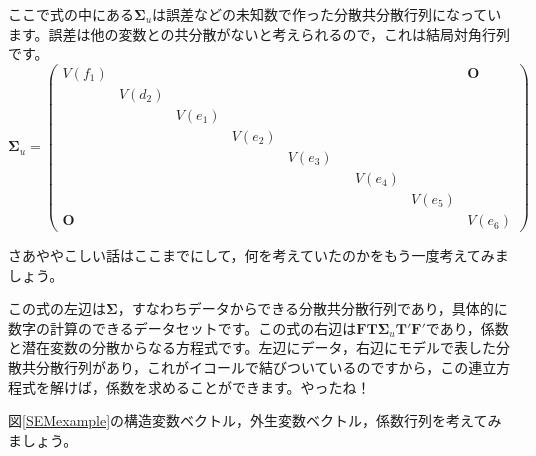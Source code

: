 \documentclass{ltjsbook}
\begin{document}
ここで式の中にある$\bm{\Sigma}_u$は誤差などの未知数で作った分散共分散行列になっています。誤差は他の変数との共分散がないと考えられるので，これは結局対角行列です。
\[
	\bm{\Sigma}_u= \begin{pmatrix}  V(f_1) &        &        &        &        &  &        &        & \bm{O} \\
                        & V(d_2) &        &        &        &  &        &        &        \\
                        &        & V(e_1) &        &        &  &        &        &        \\
                        &        &        & V(e_2) &        &  &        &        &        \\
                        &        &        &        & V(e_3) &  &        &        &        \\
                        &        &        &        &        &  & V(e_4) &        &        \\
                        &        &        &        &        &  &        & V(e_5) &        \\
                 \bm{O} &        &        &        &        &  &        &        & V(e_6)\end{pmatrix}
\]

さあややこしい話はここまでにして，何を考えていたのかをもう一度考えてみましょう。

この式の左辺は$\bm{\Sigma}$，すなわちデータからできる分散共分散行列であり，具体的に数字の計算のできるデータセットです。この式の右辺は$\bm{FT}\bm{\Sigma}_u \bm{T}'\bm{F}'$であり，係数と潜在変数の分散からなる方程式です。左辺にデータ，右辺にモデルで表した分散共分散行列があり，これがイコールで結びついているのですから，この連立方程式を解けば，係数を求めることができます。やったね！
\begin{reidai}{}{}
	図\ref{SEMexample}の構造変数ベクトル，外生変数ベクトル，係数行列を考えてみましょう。
\end{reidai}
\end{document}
